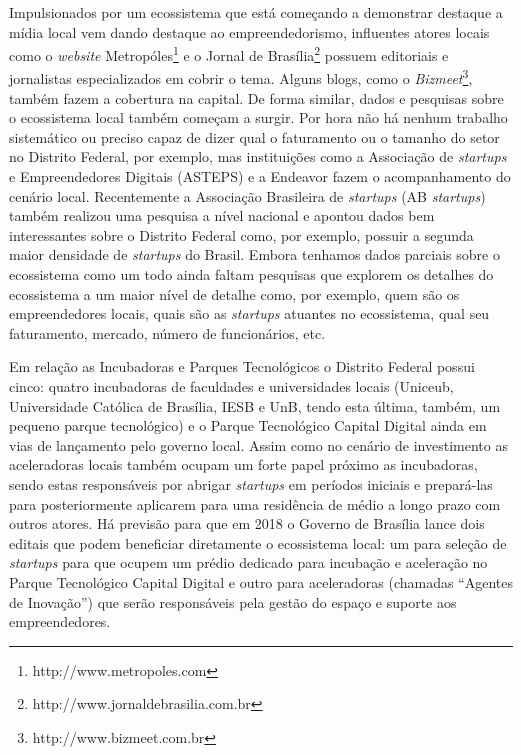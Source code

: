 Impulsionados por um ecossistema que está começando a demonstrar destaque a mídia local vem dando destaque ao empreendedorismo, influentes atores locais como o \textit{website} Metropóles\footnote{http://www.metropoles.com} e o Jornal de Brasília\footnote{http://www.jornaldebrasilia.com.br} possuem editoriais e jornalistas especializados em cobrir o tema. Alguns blogs, como o \textit{Bizmeet}\footnote{http://www.bizmeet.com.br}, também fazem a cobertura na capital. De forma similar, dados e pesquisas sobre o ecossistema local também começam a surgir. Por hora não há nenhum trabalho sistemático ou preciso capaz de dizer qual o faturamento ou o tamanho do setor no Distrito Federal, por exemplo, mas instituições como a Associação de \textit{startups} e Empreendedores Digitais (ASTEPS) e a Endeavor fazem o acompanhamento do cenário local. Recentemente a Associação Brasileira de \textit{startups} (AB \textit{startups}) também realizou uma pesquisa a nível nacional e apontou dados bem interessantes sobre o Distrito Federal como, por exemplo, possuir a segunda maior densidade de \textit{startups} do Brasil. Embora tenhamos dados parciais sobre o ecossistema como um todo ainda faltam pesquisas que explorem os detalhes do ecossistema a um maior nível de detalhe como, por exemplo, quem são os empreendedores locais, quais são as \textit{startups} atuantes no ecossistema, qual seu faturamento, mercado, número de funcionários, etc.

Em relação as Incubadoras e Parques Tecnológicos o Distrito Federal possui cinco: quatro incubadoras de faculdades e universidades locais (Uniceub, Universidade Católica de Brasília, IESB e UnB, tendo esta última, também, um pequeno parque tecnológico) e o Parque Tecnológico Capital Digital ainda em vias de lançamento pelo governo local. Assim como no cenário de investimento as aceleradoras locais também ocupam um forte papel próximo as incubadoras, sendo estas responsáveis por abrigar \textit{startups} em períodos iniciais e prepará-las para posteriormente aplicarem para uma residência de médio a longo prazo com outros atores. Há previsão para que em 2018 o Governo de Brasília lance dois editais que podem beneficiar diretamente o ecossistema local: um para seleção de \textit{startups} para que ocupem um prédio dedicado para incubação e aceleração no Parque Tecnológico Capital Digital e outro para aceleradoras (chamadas ``Agentes de Inovação'') que serão responsáveis pela gestão do espaço e suporte aos empreendedores.

